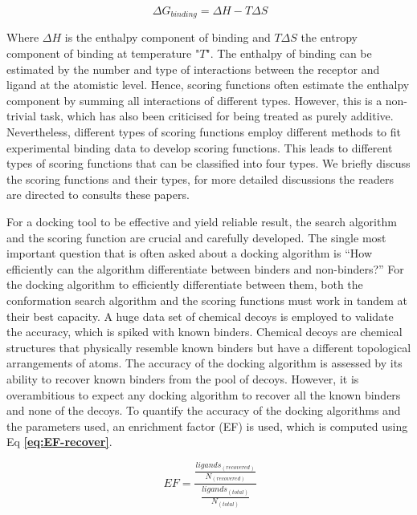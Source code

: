 \documentclass[10pt,letterpaper]{article}
\begin{document}
{{\begin{equation} 
    \label{eq:free-energy}
    \   {\Delta}G_{binding} = {\Delta}H - T{\Delta}S   
\end{equation}

Where  \({\Delta}H\) is the enthalpy component of binding and \(T{\Delta}S\) the entropy component of binding at temperature "$T$".
The enthalpy of binding can be estimated by the number and type of interactions between the receptor and ligand at the atomistic level. Hence, scoring functions often estimate the enthalpy component by summing all interactions of different types. However, this is a non-trivial task, which has also been criticised for being treated as purely additive\cite{bib61, bib62}. Nevertheless, different types of scoring functions employ different methods to fit experimental binding data to develop scoring functions. This leads to different types of scoring functions that can be classified into four types. We briefly discuss the scoring functions and their types, for more detailed discussions the readers are directed to consults these papers\cite{bib51, bib52}.

For a docking tool to be effective and yield reliable result, the search algorithm and the scoring function are crucial and carefully developed.  The single most important question that is often asked about a docking algorithm is “How efficiently can the algorithm differentiate between binders and non-binders?” For the docking algorithm to efficiently differentiate between them, both the conformation search algorithm and the scoring functions must work in tandem at their best capacity. A huge data set of chemical decoys is employed to validate the accuracy, which is spiked with known binders. Chemical decoys are chemical structures that physically resemble known binders but have a different topological arrangements of atoms. The accuracy of the docking algorithm is assessed by its ability to recover known binders from the pool of decoys. However, it is overambitious to expect any docking algorithm to recover all the known binders and none of the decoys. To quantify the accuracy of the docking algorithms and the parameters used, an enrichment factor (EF)\cite{bib4} is used, which is computed using Eq \textbf{\ref{eq:EF-recover}}.

\begin{equation} 
  \label{eq:EF-recover}
   \ EF = \frac{\frac{ligands_{(recovered)}}{N_{(recovered)}}}{\frac{ligands_{(total)}}{N_{(total)}}} 
\end{equation}

}}
\end{document}
